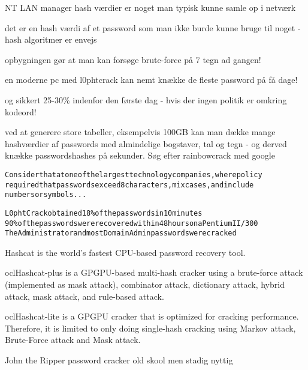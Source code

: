 \documentclass[Screen16to9,17pt]{foils}
\begin{document}
\begin{list1}
  \item NT LAN manager hash værdier er noget man typisk kunne samle op i
  netværk
\item det er en hash værdi af et password som man ikke burde kunne
  bruge til noget - hash algoritmer er envejs
\item opbygningen gør at man kan forsøge brute-force på 7 tegn ad
  gangen!
\item en moderne pc med l0phtcrack kan nemt knække de fleste password
  på få dage!
\item og sikkert 25-30\% indenfor den første dag - hvis der ingen
  politik er omkring kodeord!
\item ved at generere store tabeller, eksempelvis 100GB kan man dække
  mange hashværdier af passwords med almindelige bogstaver, tal og
  tegn - og derved knække passwordshashes på sekunder. Søg efter
  rainbowcrack med google
\end{list1}


\begin{alltt}
\small
Consider that at one of the largest technology companies, where policy
required that passwords exceed 8 characters, mix cases, and include
numbers or symbols...

L0phtCrack obtained 18\% of the passwords in 10 minutes
90\% of the passwords were recovered within 48 hours on a Pentium II/300
The Administrator and most Domain Admin passwords were cracked
\end{alltt}



\begin{list2}
\item Hashcat is the world's fastest CPU-based password recovery tool.
\item oclHashcat-plus is a GPGPU-based multi-hash cracker using a brute-force attack (implemented as mask attack), combinator attack, dictionary attack, hybrid attack, mask attack, and rule-based attack.
\item oclHashcat-lite is a GPGPU cracker that is optimized for cracking performance. Therefore, it is limited to only doing single-hash cracking using Markov attack, Brute-Force attack and Mask attack.
\item John the Ripper password cracker old skool men stadig nyttig
\end{list2}
\end{document}
